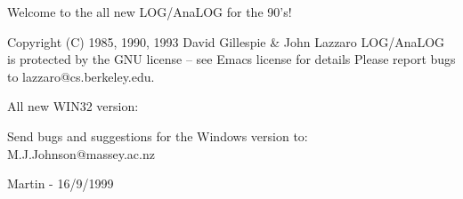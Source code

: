 
              Welcome to the all new LOG/AnaLOG for the 90's!

        Copyright (C) 1985, 1990, 1993 David Gillespie & John Lazzaro
  LOG/AnaLOG is protected by the GNU license -- see Emacs license for details
             Please report bugs to lazzaro@cs.berkeley.edu.  


              All new WIN32 version:



              Send bugs and suggestions for the Windows version to:
              M.J.Johnson@massey.ac.nz

              Martin - 16/9/1999
